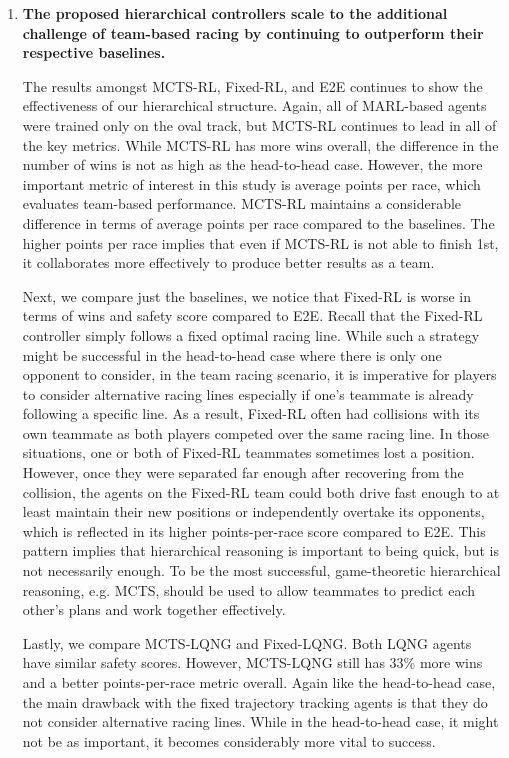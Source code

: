 \begin{enumerate}[wide, labelindent=0pt, font=\bfseries]
\item \textbf{The proposed hierarchical controllers scale to the additional challenge of team-based racing by continuing to outperform their respective baselines.} 

The results amongst MCTS-RL, Fixed-RL, and E2E continues to show the effectiveness of our hierarchical structure. Again, all of MARL-based agents were trained only on the oval track, but MCTS-RL continues to lead in all of the key metrics. While MCTS-RL has more wins overall, the difference in the number of wins is not as high as the head-to-head case. However, the more important metric of interest in this study is average points per race, which evaluates team-based performance. MCTS-RL maintains a considerable difference in terms of average points per race compared to the baselines. The higher points per race implies that even if MCTS-RL is not able to finish 1st, it collaborates more effectively to produce better results as a team. 

Next, we compare just the baselines, we notice that Fixed-RL is worse in terms of wins and safety score compared to E2E. Recall that the Fixed-RL controller simply follows a fixed optimal racing line. While such a strategy might be successful in the head-to-head case where there is only one opponent to consider, in the team racing scenario, it is imperative for players to consider alternative racing lines especially if one's teammate is already following a specific line. As a result, Fixed-RL often had collisions with its own teammate as both players competed over the same racing line. In those situations, one or both of Fixed-RL teammates sometimes lost a position. However, once they were separated far enough after recovering from the collision, the agents on the Fixed-RL team could both drive fast enough to at least maintain their new positions or independently overtake its opponents, which is reflected in its higher points-per-race score compared to E2E. This pattern implies that hierarchical reasoning is important to being quick, but is not necessarily enough. To be the most successful, game-theoretic hierarchical reasoning, e.g. MCTS, should be used to allow teammates to predict each other's plans and work together effectively. 

Lastly, we compare MCTS-LQNG and Fixed-LQNG. Both LQNG agents have similar safety scores. However, MCTS-LQNG still has 33\% more wins and a better points-per-race metric overall. Again like the head-to-head case, the main drawback with the fixed trajectory tracking agents is that they do not consider alternative racing lines. While in the head-to-head case, it might not be as important, it becomes considerably more vital to success. 


\end{enumerate}
